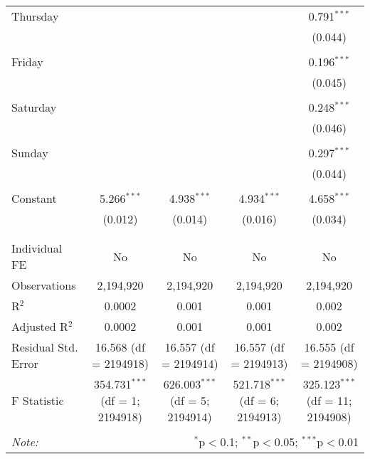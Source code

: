 \documentclass[
]{article}
\begin{document}
\begin{table}[!htbp]
{\begin{tabular}{@{\extracolsep{5pt}}lcccc}
 Thursday &  &  &  & 0.791$^{***}$ \\ 
  &  &  &  & (0.044) \\ 
  & & & & \\ 
 Friday &  &  &  & 0.196$^{***}$ \\ 
  &  &  &  & (0.045) \\ 
  & & & & \\ 
 Saturday &  &  &  & 0.248$^{***}$ \\ 
  &  &  &  & (0.046) \\ 
  & & & & \\ 
 Sunday &  &  &  & 0.297$^{***}$ \\ 
  &  &  &  & (0.044) \\ 
  & & & & \\ 
 Constant & 5.266$^{***}$ & 4.938$^{***}$ & 4.934$^{***}$ & 4.658$^{***}$ \\ 
  & (0.012) & (0.014) & (0.016) & (0.034) \\ 
  & & & & \\ 
\hline \\[-1.8ex] 
Individual FE & No & No & No & No \\ 
Observations & 2,194,920 & 2,194,920 & 2,194,920 & 2,194,920 \\ 
R$^{2}$ & 0.0002 & 0.001 & 0.001 & 0.002 \\ 
Adjusted R$^{2}$ & 0.0002 & 0.001 & 0.001 & 0.002 \\ 
Residual Std. Error & 16.568 (df = 2194918) & 16.557 (df = 2194914) & 16.557 (df = 2194913) & 16.555 (df = 2194908) \\ 
F Statistic & 354.731$^{***}$ (df = 1; 2194918) & 626.003$^{***}$ (df = 5; 2194914) & 521.718$^{***}$ (df = 6; 2194913) & 325.123$^{***}$ (df = 11; 2194908) \\ 
\hline 
\hline \\[-1.8ex] 
\textit{Note:}  & \multicolumn{4}{r}{$^{*}$p$<$0.1; $^{**}$p$<$0.05; $^{***}$p$<$0.01} \\ 
\end{tabular}
} 
\end{table} 
\newpage
\end{document}
